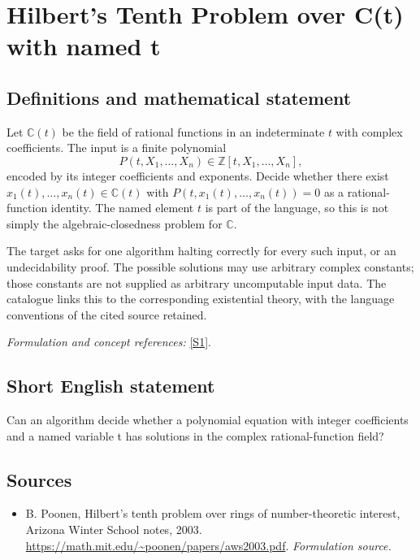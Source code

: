 \documentclass[11pt]{article}
\begin{document}
\section*{\texorpdfstring{Hilbert's Tenth Problem over C(t) with named t}{Hilbert's Tenth Problem over C(t) with named t}}\label{446}
\subsection{Definitions and mathematical statement}
Let ${\mathbb{C}}(t)$ be the field of rational functions in an indeterminate $t$ with complex coefficients. The input is a finite polynomial
\[
 P(t,X_1,\ldots,X_n)\in{\mathbb{Z}}[t,X_1,\ldots,X_n],
\]
encoded by its integer coefficients and exponents. Decide whether there exist $x_1(t),\ldots,x_n(t)\in{\mathbb{C}}(t)$ with $P(t,x_1(t),\ldots,x_n(t))=0$ as a rational-function identity. The named element $t$ is part of the language, so this is not simply the algebraic-closedness problem for ${\mathbb{C}}$.

The target asks for one algorithm halting correctly for every such input, or an undecidability proof. The possible solutions may use arbitrary complex constants; those constants are not supplied as arbitrary uncomputable input data. The catalogue links this to the corresponding existential theory, with the language conventions of the cited source retained.
\par\smallskip\textit{Formulation and concept references:} \href{https://math.mit.edu/~poonen/papers/aws2003.pdf}{[S1]}.

\subsection{Short English statement}
Can an algorithm decide whether a polynomial equation with integer coefficients and a named variable t has solutions in the complex rational-function field?
\subsection{Sources}
\begin{itemize}
\item[S1]B. Poonen, Hilbert's tenth problem over rings of number-theoretic interest, Arizona Winter School notes, 2003.
\url{https://math.mit.edu/~poonen/papers/aws2003.pdf}.
\textit{Formulation source.}
\end{itemize}
\end{document}
